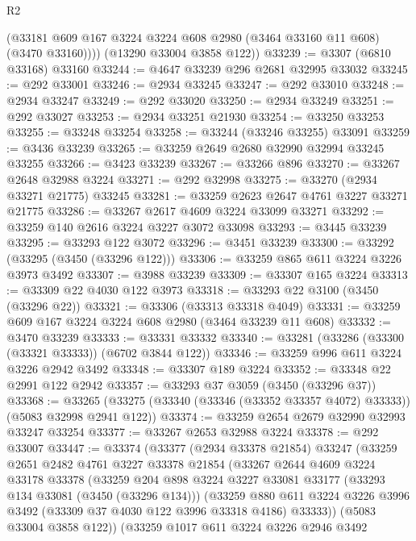 \begin{lexlean}{R2}
\begin{coremodule}
          (@33181 @609 @167 @3224 @3224 @608 @2980 (@3464 @33160 @11 @608) (@3470 @33160))))
      (@13290 @33004 @3858 @122))
@33239 := @3307 (@6810 @33168) @33160
@33244 := @4647 @33239 @296 @2681 @32995 @33032
@33245 := @292 @33001
@33246 := @2934 @33245
@33247 := @292 @33010
@33248 := @2934 @33247
@33249 := @292 @33020
@33250 := @2934 @33249
@33251 := @292 @33027
@33253 := @2934 @33251 @21930
@33254 := @33250 @33253
@33255 := @33248 @33254
@33258 := @33244 (@33246 @33255) @33091
@33259 := @3436 @33239
@33265 := @33259 @2649 @2680 @32990 @32994 @33245 @33255
@33266 := @3423 @33239
@33267 := @33266 @896
@33270 := @33267 @2648 @32988 @3224
@33271 := @292 @32998
@33275 := @33270 (@2934 @33271 @21775) @33245
@33281 := @33259 @2623 @2647 @4761 @3227 @33271 @21775
@33286 := @33267 @2617 @4609 @3224 @33099 @33271
@33292 := @33259 @140 @2616 @3224 @3227 @3072 @33098
@33293 := @3445 @33239
@33295 := @33293 @122 @3072
@33296 := @3451 @33239
@33300 := @33292 (@33295 (@3450 (@33296 @122)))
@33306 := @33259 @865 @611 @3224 @3226 @3973 @3492
@33307 := @3988 @33239
@33309 := @33307 @165 @3224
@33313 := @33309 @22 @4030 @122 @3973
@33318 := @33293 @22 @3100 (@3450 (@33296 @22))
@33321 := @33306 (@33313 @33318 @4049)
@33331 := @33259 @609 @167 @3224 @3224 @608 @2980 (@3464 @33239 @11 @608)
@33332 := @3470 @33239
@33333 := @33331 @33332
@33340 := @33281 (@33286 (@33300 (@33321 @33333)) (@6702 @3844 @122))
@33346 := @33259 @996 @611 @3224 @3226 @2942 @3492
@33348 := @33307 @189 @3224
@33352 := @33348 @22 @2991 @122 @2942
@33357 := @33293 @37 @3059 (@3450 (@33296 @37))
@33368 := @33265 (@33275 (@33340 (@33346 (@33352 @33357 @4072) @33333)) (@5083 @32998 @2941 @122))
@33374 := @33259 @2654 @2679 @32990 @32993 @33247 @33254
@33377 := @33267 @2653 @32988 @3224
@33378 := @292 @33007
@33447 := @33374
    (@33377
      (@2934 @33378 @21854)
      @33247
      (@33259
        @2651
        @2482
        @4761
        @3227
        @33378
        @21854
        (@33267
          @2644
          @4609
          @3224
          @33178
          @33378
          (@33259
            @204
            @898
            @3224
            @3227
            @33081
            @33177
            (@33293 @134 @33081 (@3450 (@33296 @134)))
            (@33259
              @880
              @611
              @3224
              @3226
              @3996
              @3492
              (@33309 @37 @4030 @122 @3996 @33318 @4186)
              @33333))
          (@5083 @33004 @3858 @122))
        (@33259
          @1017
          @611
          @3224
          @3226
          @2946
          @3492

\end{coremodule}
\end{lexlean}
